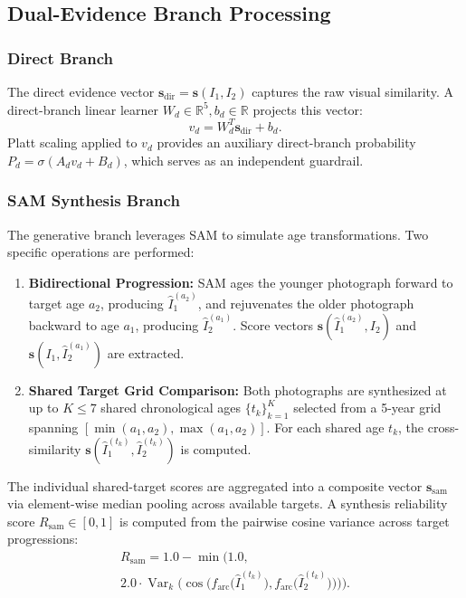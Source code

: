 \documentclass[10pt,journal,compsoc]{IEEEtran}
\newcommand{\vect}[1]{\mathbf{#1}}
\begin{document}
\subsection{Dual-Evidence Branch Processing}
\subsubsection{Direct Branch}
The direct evidence vector $\vect{s}_{\text{dir}} = \vect{s}(I_1, I_2)$ captures the raw visual similarity. A direct-branch linear learner $W_d \in \mathbb{R}^5, b_d \in \mathbb{R}$ projects this vector:
\begin{equation}
v_d = W_d^T \vect{s}_{\text{dir}} + b_d.
\end{equation}
Platt scaling applied to $v_d$ provides an auxiliary direct-branch probability $P_d = \sigma(A_d v_d + B_d)$, which serves as an independent guardrail.

\subsubsection{SAM Synthesis Branch}
The generative branch leverages SAM to simulate age transformations. Two specific operations are performed:
\begin{enumerate}
    \item \textbf{Bidirectional Progression:} SAM ages the younger photograph forward to target age $a_2$, producing $\hat{I}_1^{(a_2)}$, and rejuvenates the older photograph backward to age $a_1$, producing $\hat{I}_2^{(a_1)}$. Score vectors $\vect{s}(\hat{I}_1^{(a_2)}, I_2)$ and $\vect{s}(I_1, \hat{I}_2^{(a_1)})$ are extracted.
    \item \textbf{Shared Target Grid Comparison:} Both photographs are synthesized at up to $K \le 7$ shared chronological ages $\{t_k\}_{k=1}^K$ selected from a 5-year grid spanning $[\min(a_1, a_2), \max(a_1, a_2)]$. For each shared age $t_k$, the cross-similarity $\vect{s}(\hat{I}_1^{(t_k)}, \hat{I}_2^{(t_k)})$ is computed.
\end{enumerate}

The individual shared-target scores are aggregated into a composite vector $\vect{s}_{\text{sam}}$ via element-wise median pooling across available targets. A synthesis reliability score $R_{\text{sam}} \in [0, 1]$ is computed from the pairwise cosine variance across target progressions:
\begin{multline}
R_{\text{sam}} = 1.0 - \min\Big(1.0, \\
2.0 \cdot \operatorname{Var}_k\Big(\cos\Big(f_{\text{arc}}\big(\hat{I}_1^{(t_k)}\big), f_{\text{arc}}\big(\hat{I}_2^{(t_k)}\big)\Big)\Big)\Big).
\end{multline}
\end{document}
